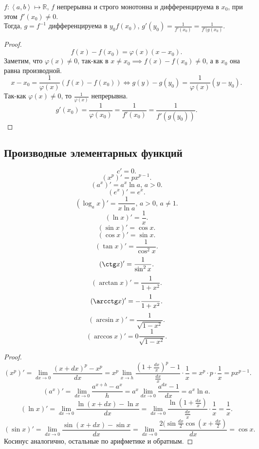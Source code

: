 \documentclass[11pt, oneside]{article}   	%
\begin{document}
      \begin{theorem}
          $f: \left<a, b\right> \mapsto \mathbb{R}$, $f$ непрерывна и строго монотонна и дифференцируема в $x_0$, при этом $f'(x_0) \neq 0$.\\
          Тогда, $g=f^{-1}$ дифференцируема в $y_0f(x_0)$, $g'(y_0) =\frac{1}{f'(x_0)} = \frac{1}{f'(g(x_0)}$.
          \begin{proof}
              \[ f(x) - f(x_0) = \varphi(x)(x-x_0) .\]
              Заметим, что $\varphi(x) \neq 0$, так-как в $x\neq x_0 \implies f(x)-f(x_0) \neq 0$, а в $x_0$ она равна производной.\\
              \[ x-x_0 = \frac{1}{\varphi(x)}(f(x)-f(x_0)) \iff g(y) - g(y_0) = \frac{1}{\varphi(x)}(y-y_0) .\]
              Так-как $\varphi(x) \neq 0$, то $\frac{1}{\varphi(x)}$ непрерывна.\\
              \[ g'(x_0) = \frac{1}{\varphi(x_0)} = \frac{1}{f'(x_0)} = \frac{1}{f'(g(y_0))} .\] 
          \end{proof}
      \end{theorem}
    \subsection{Производные элементарных функций}
        \[ c' = 0 .\]
        \[ (x^{p})' = px^{p-1} .\]
        \[ (a^{x})' = a^{x}\ln a \text{, $a>0$} .\]
        \[ (e^{x})' = e^{x} .\]
        \[ (\log_a x)' = \frac{1}{x\ln a} \text{, $a>0$,  $a\neq 1$} .\]
        \[ (\ln x)' = \frac{1}{x} .\]
        \[ (\sin x)' = \cos x .\]
        \[ (\cos x)' = \sin x .\]
        \[ (\tan x)' = \frac{1}{\cos^2 x} .\]
        \[ (\ctg x)' = \frac{1}{\sin^2 x} .\] 
        \[ (\arctan x)' = \frac{1}{1+x^2} .\]
        \[ (\arcctg x)' = -\frac{1}{1+x^2} .\]
        \[ (\arcsin x)' = \frac{1}{\sqrt{1-x^2} } .\]
        \[ (\arccos x)' = 0\frac{1}{\sqrt{1-x^2} } .\] 
        \begin{proof}
            \[ (x^{p})' = \lim\limits_{dx \to 0} \frac{(x+dx)^{p}-x^{p}}{dx} = x^{p} \lim\limits_{x \to h} \frac{(1+\frac{dx}{x})^{p} - 1}{\frac{dx}{x}}\cdot \frac{1}{x} = x^{p}\cdot p\cdot \frac{1}{x} = px^{p-1}  .\]
            \[ (a^{x})' = \lim\limits_{dx \to 0} \frac{a^{x+h}-a^{x}}{h} = a^{x} \lim\limits_{dx \to 0} \frac{a^{dx}-1}{dx} = a^{x}\ln a .\]
            \[ (\ln x)' = \lim\limits_{dx \to 0} \frac{\ln(x+dx)-\ln x}{dx} = \lim\limits_{dx \to 0} \frac{\ln\left( 1+\frac{dx}{x} \right) }{\frac{dx}{x}}\cdot \frac{1}{x} = \frac{1}{x}  .\]
            \[ (\sin x)' = \lim\limits_{dx \to 0} \frac{\sin(x+dx)-\sin x}{dx} = \lim\limits_{dx \to 0} \frac{2(\sin \frac{dx}{2}\cos\left( x+\frac{dx}{2} \right) }{dx} = \cos x .\]
            Косинус аналогично, остальные по арифметике и обратным.
        \end{proof}
\end{document}
